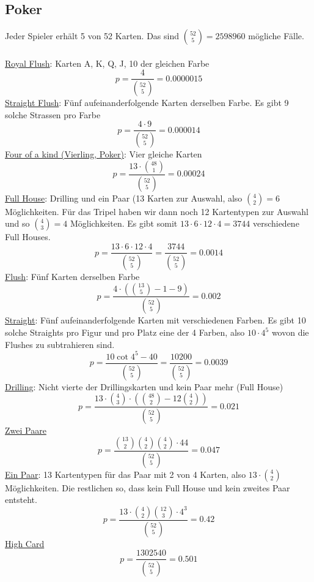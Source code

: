 \documentclass{article}
\begin{document}
\subsection{Poker}
Jeder Spieler erhält 5 von 52 Karten. Das sind $\binom{52}{5} = 2 598 960$ mögliche Fälle.\\\\
\underline{Royal Flush}: Karten A, K, Q, J, 10 der gleichen Farbe
\begin{equation}
p = \frac{4}{\binom{52}{5}} = 0.0000015
\end{equation}
\underline{Straight Flush}: Fünf aufeinanderfolgende Karten derselben Farbe. Es gibt 9 solche Strassen pro Farbe
\begin{equation}
p = \frac{4 \cdot 9}{\binom{52}{5}} = 0.000014
\end{equation}
\underline{Four of a kind (Vierling, Poker)}: Vier gleiche Karten
\begin{equation}
p = \frac{13 \cdot \binom{48}{1}}{\binom{52}{5}} = 0.00024
\end{equation}
\underline{Full House}: Drilling und ein Paar (13 Karten zur Auswahl, also $\binom{4}{2} = 6$ Möglichkeiten. Für das Tripel haben wir dann noch 12 Kartentypen zur Auswahl und so $\binom{4}{3} = 4$ Möglichkeiten. Es gibt somit $13 \cdot 6 \cdot 12 \cdot 4 = 3744$ verschiedene Full Houses.
\begin{equation}
p = \frac{13 \cdot 6 \cdot 12 \cdot 4}{\binom{52}{5}} = \frac{3744}{\binom{52}{5}} = 0.0014
\end{equation}
\underline{Flush}: Fünf Karten derselben Farbe
\begin{equation}
p = \frac{4 \cdot (\binom{13}{5} - 1 - 9)}{\binom{52}{5}} = 0.002
\end{equation}
\underline{Straight}: Fünf aufeinanderfolgende Karten mit verschiedenen Farben. Es gibt 10 solche Straights pro Figur und pro Platz eine der 4 Farben, also $10 \cdot 4^5$ wovon die Flushes zu subtrahieren sind.
\begin{equation}
p = \frac{10 \cot 4^5 - 40}{\binom{52}{5}} = \frac{10 200}{\binom{52}{5}} = 0.0039
\end{equation}
\underline{Drilling}: Nicht vierte der Drillingskarten und kein Paar mehr (Full House)
\begin{equation}
p = \frac{13 \cdot \binom{4}{3} \cdot (\binom{48}{2} - 12 \binom{4}{2})}{\binom{52}{5}} = 0.021
\end{equation}
\underline{Zwei Paare}
\begin{equation}
p = \frac{\binom{13}{2} \binom{4}{2} \binom{4}{2} \cdot 44}{\binom{52}{5}} = 0.047
\end{equation}
\underline{Ein Paar}: 13 Kartentypen für das Paar mit 2 von 4 Karten, also $13 \cdot \binom{4}{2}$ Möglichkeiten. Die restlichen so, dass kein Full House und kein zweites Paar entsteht.
\begin{equation}
p = \frac{13 \cdot \binom{4}{2} \binom{12}{3} \cdot 4^3}{\binom{52}{5}} = 0.42
\end{equation}
\underline{High Card}
\begin{equation}
p = \frac{1 302 540}{\binom{52}{5}} = 0.501
\end{equation}
\end{document}
